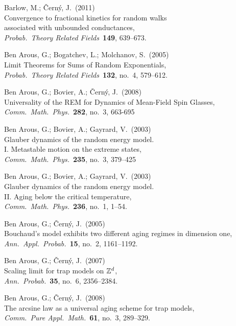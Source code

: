 
\begin{thebibliography}{xxxxxx 89} 

 Barlow, M.; \v Cern\'y, J.~(2011)\\
Convergence to fractional kinetics for random walks\\ associated with unbounded conductances,\\ 
{\em Probab.~Theory Related Fields}~{\bf 149}, 639--673.

 Ben Arous, G.; Bogatchev, L.; Molchanov, S.~(2005)\\ 
Limit Theorems for Sums of Random Exponentials,\\ 
{\em Probab.~Theory Related Fields}~{\bf 132}, no.~4, 579--612. 

 Ben Arous, G.; Bovier, A.; \v Cern\'y, J.~(2008)\\		
Universality of the REM for Dynamics of Mean-Field Spin Glasses,\\ 
{\em Comm.~Math.~Phys.}~{\bf 282}, no.~3, 663-695

 Ben Arous, G.; Bovier, A.; Gayrard, V.~(2003)\\
Glauber dynamics of the random energy model.\\ I. Metastable motion on the extreme states,\\
{\em Comm.~Math.~Phys.}~{\bf 235}, no.~3, 379--425

 Ben Arous, G.; Bovier, A.; Gayrard, V.~(2003)\\
Glauber dynamics of the random energy model.\\ II. Aging below the critical temperature,\\
{\em Comm.~Math.~Phys.}~{\bf 236}, no.~1, 1--54. 

 Ben Arous, G.; \v Cern\'y, J.~(2005)\\
Bouchaud's model exhibits two different aging regimes in dimension one,\\
{\em Ann.~Appl.~Probab.}~{\bf 15}, no.~2, 1161--1192.

 Ben Arous, G.; \v Cern\'y, J.~(2007)\\
Scaling limit for trap models on ${\mathbb Z}^d$,\\
{\em Ann.~Probab.}~{\bf 35}, no.~6, 2356--2384. 

 Ben Arous, G.; \v Cern\'y, J.~(2008)\\
The arcsine law as a universal aging scheme for trap models,\\
{\em  Comm.~Pure Appl.~Math.}~{\bf 61}, no.~3, 289--329. 


\end{thebibliography}
